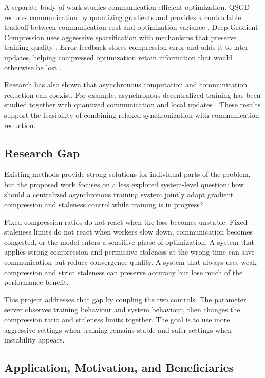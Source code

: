 \documentclass[conference]{IEEEtran}
\begin{document}
A separate body of work studies communication-efficient optimization. QSGD reduces communication by quantizing gradients and provides a controllable tradeoff between communication cost and optimization variance \cite{alistarh2017qsgd}. Deep Gradient Compression uses aggressive sparsification with mechanisms that preserve training quality \cite{lin2018dgc}. Error feedback stores compression error and adds it to later updates, helping compressed optimization retain information that would otherwise be lost \cite{karimireddy2019ef}.

Research has also shown that asynchronous computation and communication reduction can coexist. For example, asynchronous decentralized training has been studied together with quantized communication and local updates \cite{nadiradze2021async}. These results support the feasibility of combining relaxed synchronization with communication reduction.

\subsection{Research Gap}

Existing methods provide strong solutions for individual parts of the problem, but the proposed work focuses on a less explored system-level question: how should a centralized asynchronous training system jointly adapt gradient compression and staleness control while training is in progress?

Fixed compression ratios do not react when the loss becomes unstable. Fixed staleness limits do not react when workers slow down, communication becomes congested, or the model enters a sensitive phase of optimization. A system that applies strong compression and permissive staleness at the wrong time can save communication but reduce convergence quality. A system that always uses weak compression and strict staleness can preserve accuracy but lose much of the performance benefit.

This project addresses that gap by coupling the two controls. The parameter server observes training behaviour and system behaviour, then changes the compression ratio and staleness limits together. The goal is to use more aggressive settings when training remains stable and safer settings when instability appears.

\subsection{Application, Motivation, and Beneficiaries}
\end{document}

